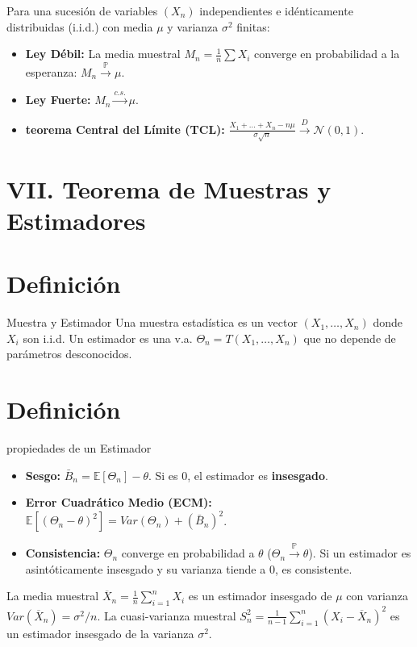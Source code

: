 \begin{teorema}
Para una sucesión de variables $(X_n)$ independientes e idénticamente distribuidas (i.i.d.) con media $\mu$ y varianza $\sigma^2$ finitas:
\begin{itemize}
    \item \textbf{Ley Débil:} La media muestral $M_n = \frac{1}{n}\sum X_i$ converge en probabilidad a la esperanza: $M_n \xrightarrow{\mathbb{P}} \mu$.
    \item \textbf{Ley Fuerte:} $M_n \xrightarrow{c.s.} \mu$.
    \item \textbf{teorema Central del Límite (TCL):} $\frac{X_1 + \dots + X_n - n\mu}{\sigma\sqrt{n}} \xrightarrow{D} \mathcal{N}(0,1)$.
\end{itemize}
\end{teorema}

\section*{VII. Teorema de Muestras y Estimadores}

\section*{Definición}{Muestra y Estimador} Una muestra estadística es un vector $(X_1, \dots, X_n)$ donde $X_i$ son i.i.d. Un estimador es una v.a. $\Theta_n = T(X_1, \dots, X_n)$ que no depende de parámetros desconocidos.

\section*{Definición}{propiedades de un Estimador} 
\begin{itemize}
    \item \textbf{Sesgo:} $\bar{B}_n = \mathbb{E}[\Theta_n] - \theta$. Si es $0$, el estimador es \textbf{insesgado}.
    \item \textbf{Error Cuadrático Medio (ECM):} $\mathbb{E}[(\Theta_n - \theta)^2] = Var(\Theta_n) + (\bar{B}_n)^2$.
    \item \textbf{Consistencia:} $\Theta_n$ converge en probabilidad a $\theta$ ($\Theta_n \xrightarrow{\mathbb{P}} \theta$). Si un estimador es asintóticamente insesgado y su varianza tiende a 0, es consistente.
\end{itemize}

\begin{proposicion}
La media muestral $\overline{X}_n = \frac{1}{n}\sum_{i=1}^n X_i$ es un estimador insesgado de $\mu$ con varianza $Var(\overline{X}_n) = \sigma^2/n$. La cuasi-varianza muestral $S_n^2 = \frac{1}{n-1}\sum_{i=1}^n (X_i - \overline{X}_n)^2$ es un estimador insesgado de la varianza $\sigma^2$.
\end{proposicion}

